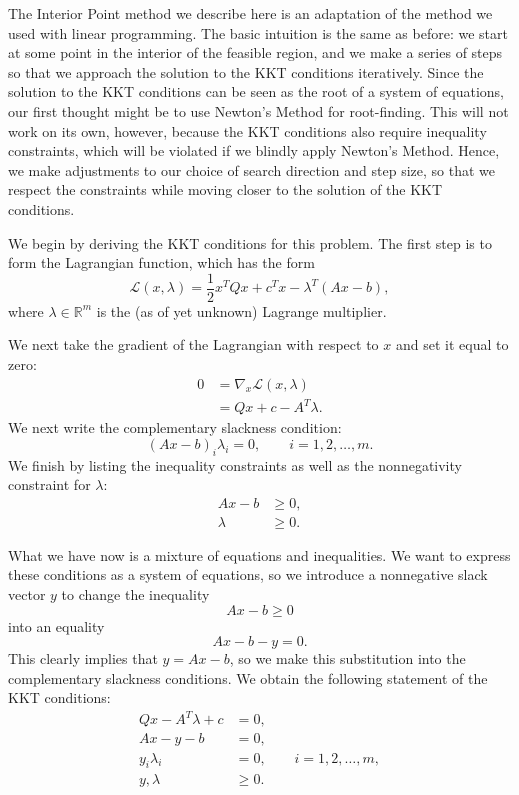 The Interior Point method we describe here is an adaptation of the method we used with linear
programming. The basic intuition is the same as before: we start at some point in the interior of the
feasible region, and we make a series of steps so that we approach the solution to the KKT conditions
iteratively. Since the solution to the KKT conditions can be seen as the root of a system of equations,
our first thought might be to use Newton's Method for root-finding. This will not work on its own, however,
because the KKT conditions also require inequality constraints, which will be violated if we blindly apply
Newton's Method. Hence, we make adjustments to our choice of search direction and step size, so that we
respect the constraints while moving closer to the solution of the KKT conditions.

We begin by deriving the KKT conditions for this problem. The first step is to form the Lagrangian function,
which has the form
\[
\mathcal{L}(x,\lambda) = \frac{1}{2}x^TQx + c^Tx - \lambda^T(Ax -b),
\]
where $\lambda \in \mathbb{R}^m$ is the (as of yet unknown) Lagrange multiplier.

We next take the gradient of the Lagrangian with respect to $x$ and set it equal to zero:
\begin{align*}
0 &= \nabla_x \mathcal{L}(x,\lambda)\\
&= Qx + c - A^T\lambda.
\end{align*}
We next write the complementary slackness condition:
\[
(Ax - b)_i\lambda_i = 0, \qquad i=1,2,\ldots,m.
\]
We finish by listing the inequality constraints as well as the nonnegativity constraint for $\lambda$:
\begin{align*}
Ax - b &\geq 0,\\
\lambda &\geq 0.
\end{align*}

What we have now is a mixture of equations and inequalities. We want to express these conditions as a system of equations,
so we introduce a nonnegative slack vector $y$ to change the inequality
\[
Ax - b \geq 0
\]
into an equality
\[
Ax - b - y = 0.
\]
This clearly implies that $y = Ax - b$, so we make this substitution into the complementary slackness conditions.
We obtain the following statement of the KKT conditions:
\begin{align*}
Qx - A^T\lambda + c &= 0,\\
Ax - y - b &= 0,\\
y_i\lambda_i &= 0, \qquad i=1,2,\ldots,m,\\
y,\lambda &\geq 0.
\end{align*}

